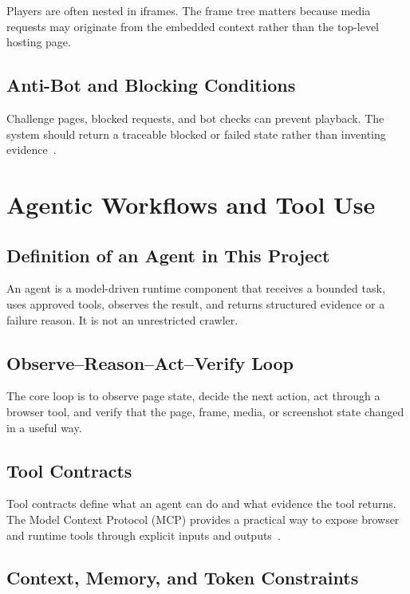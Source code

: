 Players are often nested in iframes. The frame tree matters because media
requests may originate from the embedded context rather than the top-level
hosting page.

\subsection{Anti-Bot and Blocking Conditions}

Challenge pages, blocked requests, and bot checks can prevent playback. The
system should return a traceable blocked or failed state rather than inventing
evidence~\cite{cloudflare-challenges,ublock}.

\section{Agentic Workflows and Tool Use}

\subsection{Definition of an Agent in This Project}

An agent is a model-driven runtime component that receives a bounded task, uses
approved tools, observes the result, and returns structured evidence or a
failure reason. It is not an unrestricted crawler.

\subsection{Observe--Reason--Act--Verify Loop}

The core loop is to observe page state, decide the next action, act through a
browser tool, and verify that the page, frame, media, or screenshot state
changed in a useful way.



\subsection{Tool Contracts}

Tool contracts define what an agent can do and what evidence the tool returns.
The Model Context Protocol (MCP) provides a practical way to expose browser and
runtime tools through explicit inputs and outputs~\cite{mcp-spec}.

\subsection{Context, Memory, and Token Constraints}

